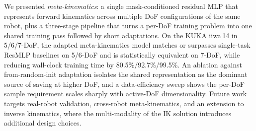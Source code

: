 \documentclass[conference]{IEEEtran}
\begin{document}
We presented \emph{meta-kinematics}: a single mask-conditioned residual MLP that represents forward kinematics across multiple DoF configurations of the same robot, plus a three-stage pipeline that turns a per-DoF training problem into one shared training pass followed by short adaptations. On the KUKA iiwa\,14 in 5/6/7-DoF, the adapted meta-kinematics model matches or surpasses single-task ResMLP baselines on 5/6-DoF and is statistically equivalent on 7-DoF, while reducing wall-clock training time by 80.5\%/92.7\%/99.5\%. An ablation against from-random-init adaptation isolates the shared representation as the dominant source of saving at higher DoF, and a data-efficiency sweep shows the per-DoF sample requirement scales sharply with active-DoF dimensionality. Future work targets real-robot validation, cross-robot meta-kinematics, and an extension to inverse kinematics, where the multi-modality of the IK solution introduces additional design choices.
\end{document}
